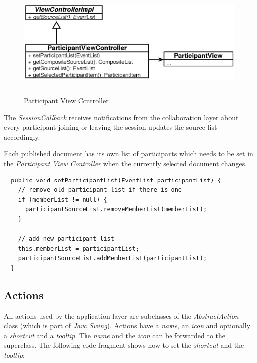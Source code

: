 \begin{figure}[H]
\begin{center}
  \includegraphics[height=2.15in, width=5.62in]{../images/finalreport/application_participantview.eps}
\caption{Participant View Controller}
\label{application_participantview}
\end{center}
\end{figure}

The \textit{Session\-Callback} receives notifications from the collaboration layer about every participant joining or leaving the session updates the source list accordingly.

Each published document has its own list of participants which needs to be set in the \textit{Participant View Controller} when the currently selected document changes.


\begin{verbatim}
  public void setParticipantList(EventList participantList) {
    // remove old participant list if there is one
    if (memberList != null) {
      participantSourceList.removeMemberList(memberList);
    }

    // add new participant list    
    this.memberList = participantList;
    participantSourceList.addMemberList(participantList);
  }
\end{verbatim}

\subsection{Actions}
All actions used by the application layer are subclasses of the \textit{AbstractAction} class (which is part of \emph{Java Swing}). Actions have a \textit{name}, an \textit{icon} and optionally a \textit{shortcut} and a \textit{tooltip}. The \textit{name} and the \textit{icon} can be forwarded to the superclass. The following code fragment shows how to set the \textit{shortcut} and the \textit{tooltip}:

